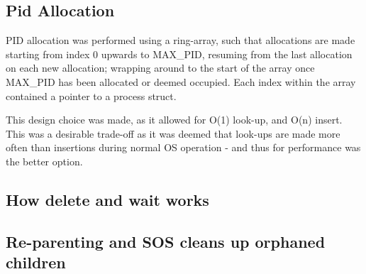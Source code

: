 \documentclass[runningheads,a4paper]{llncs}
\begin{document}
\subsection{Pid Allocation}
PID allocation was performed using a ring-array, such that allocations are made starting from index 0 upwards to MAX\_PID, resuming from the last allocation on each new allocation; wrapping around to the start of the array once MAX\_PID has been allocated or deemed occupied. Each index within the array contained a pointer to a process struct.

This design choice was made, as it allowed for O(1) look-up, and O(n) insert. This was a desirable trade-off as it was deemed that look-ups are made more often than insertions during normal OS operation - and thus for performance was the better option.

\subsection{How delete and wait works}

\subsection{Re-parenting and SOS cleans up orphaned children}

\medskip
\medskip


\nocite{*} 
\end{document}
